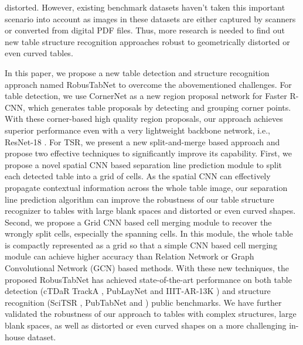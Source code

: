 \documentclass[final,3p,times,twocolumn]{elsarticle}
\begin{document}
distorted. However, existing benchmark datasets haven’t taken this important scenario into account as images in these datasets are either captured by scanners or converted from digital PDF files. Thus, more research is needed to find out new table structure recognition approaches robust to geometrically distorted or even curved tables.

In this paper, we propose a new table detection and structure recognition approach named RobusTabNet to overcome the abovementioned challenges. For table detection, we use CornerNet \cite{law2018cornernet} as a new region proposal network for Faster R-CNN, which generates table proposals by detecting and grouping corner points. With these corner-based high quality region proposals, our approach achieves superior performance even with a very lightweight backbone network, i.e., ResNet-18 \cite{he2016deep}. For TSR, we present a new split-and-merge based approach and propose two effective techniques to significantly improve its capability. First, we propose a novel spatial CNN \cite{pan2018spatial} based separation line prediction module to split each detected table into a grid of cells. As the spatial CNN can effectively propagate contextual information across the whole table image, our separation line prediction algorithm can improve the robustness of our table structure recognizer to tables with large blank spaces and distorted or even curved shapes. Second, we propose a Grid CNN based cell merging module to recover the wrongly split cells, especially the spanning cells. In this module, the whole table is compactly represented as a grid so that a simple CNN based cell merging module can achieve higher accuracy than Relation Network or Graph Convolutional Network (GCN) based methods. With these new techniques, the proposed RobusTabNet has achieved state-of-the-art performance on both table detection (cTDaR TrackA \cite{gao2019icdar}, PubLayNet \cite{zhong2019publaynet} and IIIT-AR-13K \cite{mondal2020iiit}) and structure recognition (SciTSR \cite{chi2019complicated}, PubTabNet \cite{zhong2020image} and {\color{black}{cTDaR TrackB2-Modern}} \cite{gao2019icdar}) public benchmarks. We have further validated the robustness of our approach to tables with complex structures, large blank spaces, as well as distorted or even curved shapes on a more challenging in-house dataset.
\end{document}
